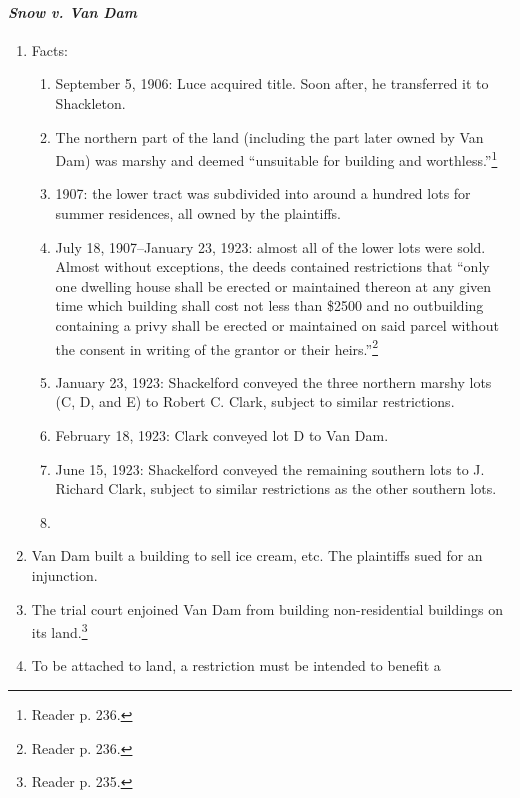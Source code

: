 \paragraph{\emph{Snow v. Van Dam}}

\begin{enumerate}
    \item Facts:
    \begin{enumerate}
        \item September 5, 1906: Luce acquired title. Soon after, he 
        transferred it to Shackleton.
        \item The northern part of the land (including the part later owned by 
        Van Dam) was marshy and deemed ``unsuitable for building and 
        worthless.''\footnote{Reader p. 236.}
        \item 1907: the lower tract was subdivided into around a hundred lots 
        for summer residences, all owned by the plaintiffs.
        \item July 18, 1907--January 23, 1923: almost all of the lower lots 
        were sold. Almost without exceptions, the deeds contained restrictions 
        that ``only one dwelling house shall be erected or maintained thereon 
        at any given time which building shall cost not less than \$2500 and 
        no outbuilding containing a privy shall be erected or maintained on 
        said parcel without the consent in writing of the grantor or their 
        heirs.''\footnote{Reader p. 236.}
        \item January 23, 1923: Shackelford conveyed the three northern marshy 
        lots (C, D, and E) to Robert C. Clark, subject to similar 
        restrictions.
        \item February 18, 1923: Clark conveyed lot D to Van Dam. 
        \item June 15, 1923: Shackelford conveyed the remaining southern lots 
        to J. Richard Clark, subject to similar restrictions as the other 
        southern lots.
        \item 
    \end{enumerate}
    \item Van Dam built a building to sell ice cream, etc. The plaintiffs sued 
    for an injunction.
    \item The trial court enjoined Van Dam from building non-residential 
    buildings on its land.\footnote{Reader p. 235.}
    \item To be attached to land, a restriction must be intended to benefit a 

\end{enumerate}
